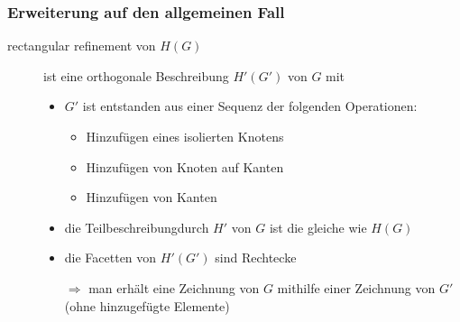 \subsubsection{Erweiterung auf den allgemeinen Fall}
\begin{description}
	\item[rectangular refinement von $H(G)$] ist eine orthogonale Beschreibung $H'(G')$ von $G$ mit
		\begin{itemize}
			\item $G'$ ist entstanden aus einer Sequenz der folgenden Operationen:
				\begin{itemize}
					\item Hinzufügen eines isolierten Knotens
					\item Hinzufügen von Knoten auf Kanten
					\item Hinzufügen von Kanten
				\end{itemize}
			\item die \glqq Teilbeschreibung\grqq durch $H'$ von $G$ ist die gleiche wie $H(G)$
			\item die Facetten von $H'(G')$ sind Rechtecke
			\item[$\Rightarrow$] man erhält eine Zeichnung von $G$ mithilfe einer Zeichnung von $G'$ (ohne hinzugefügte Elemente) 
		\end{itemize}
\end{description}
